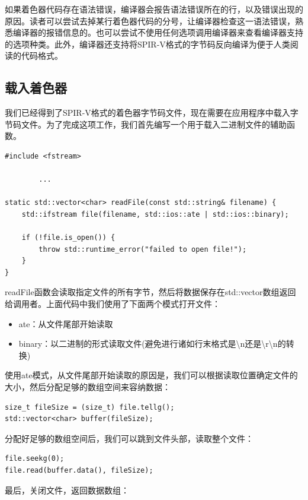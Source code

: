 \documentclass{ctexart}
\begin{document}
如果着色器代码存在语法错误，编译器会报告语法错误所在的行，以及错误出现的原因。读者可以尝试去掉某行着色器代码的分号，让编译器检查这一语法错误，熟悉编译器的报错信息的。也可以尝试不使用任何选项调用编译器来查看编译器支持的选项种类。此外，编译器还支持将SPIR-V格式的字节码反向编译为便于人类阅读的代码格式。

\subsection{载入着色器}

我们已经得到了SPIR-V格式的着色器字节码文件，现在需要在应用程序中载入字节码文件。为了完成这项工作，我们首先编写一个用于载入二进制文件的辅助函数。

\begin{lstlisting}[language={[ANSI]C}]
#include <fstream>

		...

static std::vector<char> readFile(const std::string& filename) {
	std::ifstream file(filename, std::ios::ate | std::ios::binary);

	if (!file.is_open()) {
		throw std::runtime_error("failed to open file!");
	}
}
\end{lstlisting}

readFile函数会读取指定文件的所有字节，然后将数据保存在std::vector数组返回给调用者。上面代码中我们使用了下面两个模式打开文件：

\begin{itemize}
	\item ate：从文件尾部开始读取
	\item binary：以二进制的形式读取文件(避免进行诸如行末格式是\textbackslash n还是\textbackslash r\textbackslash n的转换)
\end{itemize}

使用ate模式，从文件尾部开始读取的原因是，我们可以根据读取位置确定文件的大小，然后分配足够的数组空间来容纳数据：

\begin{lstlisting}[language={[ANSI]C}]
size_t fileSize = (size_t) file.tellg();
std::vector<char> buffer(fileSize);
\end{lstlisting}

分配好足够的数组空间后，我们可以跳到文件头部，读取整个文件：

\begin{lstlisting}[language={[ANSI]C}]
file.seekg(0);
file.read(buffer.data(), fileSize);
\end{lstlisting}

最后，关闭文件，返回数据数组：
\end{document}
